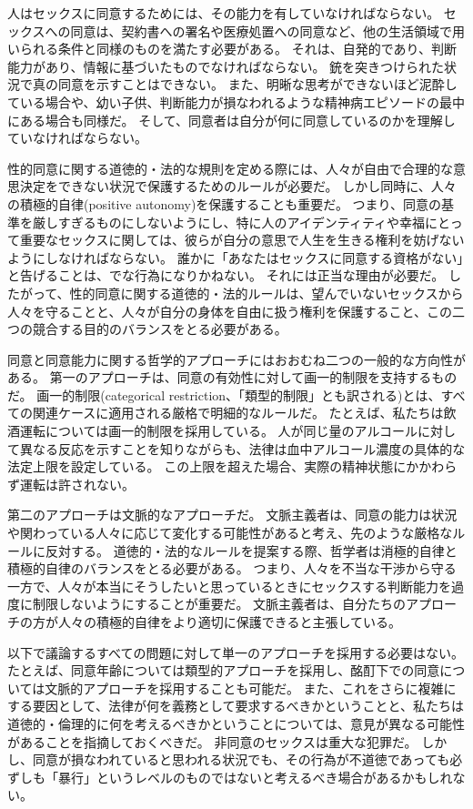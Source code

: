 \documentclass[paper=a4,book,openany]{jlreq} \usepackage{mystyle}
\begin{document}
人はセックスに同意するためには、その能力を有していなければならない。
セックスへの同意は、契約書への署名や医療処置への同意など、他の生活領域で用いられる条件と同様のものを満たす必要がある。
それは、自発的であり、判断能力があり、情報に基づいたものでなければならない。
銃を突きつけられた状況で真の同意を示すことはできない。
また、明晰な思考ができないほど泥酔している場合や、幼い子供、判断能力が損なわれるような精神病エピソードの最中にある場合も同様だ。
そして、同意者は自分が何に同意しているのかを理解していなければならない。

性的同意に関する道徳的・法的な規則を定める際には、人々が自由で合理的な意思決定をできない状況で保護するためのルールが必要だ。
しかし同時に、人々の積極的自律(positive autonomy)を保護することも重要だ。
つまり、同意の基準を厳しすぎるものにしないようにし、特に人のアイデンティティや幸福にとって重要なセックスに関しては、彼らが自分の意思で人生を生きる権利を妨げないようにしなければならない。
誰かに「あなたはセックスに同意する資格がない」と告げることは、でな行為になりかねない。
それには正当な理由が必要だ。
したがって、性的同意に関する道徳的・法的ルールは、望んでいないセックスから人々を守ることと、人々が自分の身体を自由に扱う権利を保護すること、この二つの競合する目的のバランスをとる必要がある。

同意と同意能力に関する哲学的アプローチにはおおむね二つの一般的な方向性がある。
第一のアプローチは、同意の有効性に対して画一的制限を支持するものだ。
画一的制限(categorical restriction、「類型的制限」とも訳される)とは、すべての関連ケースに適用される厳格で明細的なルールだ。
たとえば、私たちは飲酒運転については画一的制限を採用している。
人が同じ量のアルコールに対して異なる反応を示すことを知りながらも、法律は血中アルコール濃度の具体的な法定上限を設定している。
この上限を超えた場合、実際の精神状態にかかわらず運転は許されない。

第二のアプローチは文脈的なアプローチだ。
文脈主義者は、同意の能力は状況や関わっている人々に応じて変化する可能性があると考え、先のような厳格なルールに反対する。
道徳的・法的なルールを提案する際、哲学者は消極的自律と積極的自律のバランスをとる必要がある。
つまり、人々を不当な干渉から守る一方で、人々が本当にそうしたいと思っているときにセックスする判断能力を過度に制限しないようにすることが重要だ。
文脈主義者は、自分たちのアプローチの方が人々の積極的自律をより適切に保護できると主張している。

以下で議論するすべての問題に対して単一のアプローチを採用する必要はない。
たとえば、同意年齢については類型的アプローチを採用し、酩酊下での同意については文脈的アプローチを採用することも可能だ。
また、これをさらに複雑にする要因として、法律が何を義務として要求するべきかということと、私たちは道徳的・倫理的に何を考えるべきかということについては、意見が異なる可能性があることを指摘しておくべきだ。
非同意のセックスは重大な犯罪だ。
しかし、同意が損なわれていると思われる状況でも、その行為が不道徳であっても必ずしも「暴行」というレベルのものではないと考えるべき場合があるかもしれない。
\end{document}
